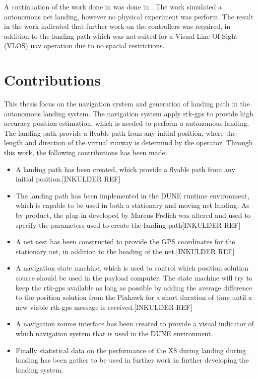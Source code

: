 A continuation of the work done in \citep{Skulstad&Syversen} was done in \citep{Froelich}. The work simulated a autonomous net landing, however no physical experiment was perform. The result in the work indicated that further work on the controllers was required, in addition to the landing path which was not suited for a Visual Line Of Sight  (VLOS) \gls{uav} operation due to no spacial restrictions.
\section{Contributions}
This thesis focus on the navigation system and generation of landing path in the autonomous landing system. The navigation system apply \gls{rtk-gps} to provide high accuracy position estimation, which is needed to perform a autonomous landing. The landing path provide a flyable path from any initial position, where the length and direction of the virtual runway is determind by the operator. Through this work, the following contributions has been made:
\begin{itemize}
\item A landing path has been created, which provide a flyable path from any initial position.[INKULDER REF]
\item The landing path has been implemented in the DUNE runtime environment, which is capable to be used in both a stationary and moving net landing. As by product, the plug-in developed by Marcus Frølich \citep{Froelich} was altered and used to specify the parameters used to create the landing path[INKULDER REF]
\item A net nest has been constructed to provide the GPS coordinates for the stationary net, in addition to the heading of the net.[INKULDER REF]
\item A navigation state machine, which is used to control which position solution source should be used in the payload computer. The state machine will try to keep the \gls{rtk-gps} available as long as possible by adding the average difference to the position solution from the Pixhawk for a short duration of time until a new viable \gls{rtk-gps} message is received.[INKULDER REF]
\item  A navigation source interface has been created to provide a visual indicator of which navigation system that is used in the DUNE environment.
\item Finally statistical data on the performance of the X8 during landing during landing has been gather to be used in further work in further developing the landing system.
\end{itemize}
\cleardoublepage